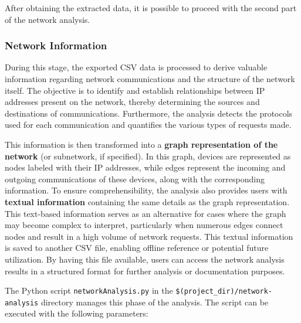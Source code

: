 \bigskip
After obtaining the extracted data, it is possible to proceed with the second part of the network analysis.
\vfill

\subsubsection{Network Information}
\label{subsubsec:4_draw_network}
During this stage, the exported CSV data is processed to derive valuable information regarding network communications and the structure of the network itself. The objective is to identify and establish relationships between IP addresses present on the network, thereby determining the sources and destinations of communications. Furthermore, the analysis detects the protocols used for each communication and quantifies the various types of requests made.

\bigskip
This information is then transformed into a \textbf{graph representation of the network} (or subnetwork, if specified). In this graph, devices are represented as nodes labeled with their IP addresses, while edges represent the incoming and outgoing communications of these devices, along with the corresponding information.\newline
To ensure comprehensibility, the analysis also provides users with \textbf{textual information} containing the same details as the graph representation. This text-based information serves as an alternative for cases where the graph may become complex to interpret, particularly when numerous edges connect nodes and result in a high volume of network requests.\newline
This textual information is saved to another CSV file, enabling offline reference or potential future utilization. By having this file available, users can access the network analysis results in a structured format for further analysis or documentation purposes.

\bigskip
The Python script \texttt{networkAnalysis.py} in the \texttt{\$(project\_dir)/network-analysis} directory manages this phase of the analysis. The script can be executed with the following parameters:


